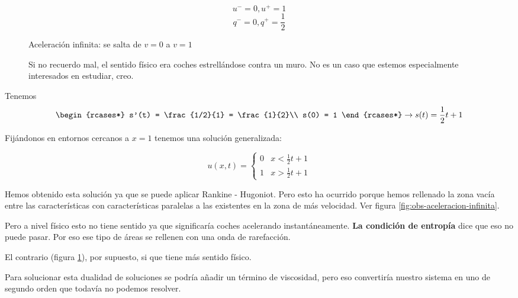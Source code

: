 		$$u^{-} = 0, u^+ = 1$$
		$$q^{-} = 0, q^+ = \frac{1}{2}$$

		\begin{figure}[hbtp]
			\centering
			\begin{minipage}[t]{0.45\textwidth}
				\centering
				\caption{Aceleración infinita: se salta de $v=0$ a $v=1$}
				\label{fig:obs-aceleracion-infinita}
			\end{minipage}\quad
			\begin{minipage}[t]{0.45\textwidth}
				\centering
				\caption{Si no recuerdo mal, el sentido físico era coches estrellándose contra un muro. No es un caso que estemos especialmente interesados en estudiar, creo.}
				\label{fig:obs-muro}
			\end{minipage}
		\end{figure}

		Tenemos
		\[
		\begin{rcases*}
			s'(t) = \frac{1/2}{1} = \frac{1}{2}\\
			s(0) = 1
		\end{rcases*} \rightarrow s(t) = \frac{1}{2}t + 1
		\]

		Fijándonos en entornos cercanos a $x=1$ tenemos una solución generalizada:

		$$u(x,t) =
		\begin{cases}
			0 & x < \frac{1}{2} t + 1 \\
			1 & x > \frac{1}{2} t + 1
		\end{cases}$$


		Hemos obtenido esta solución ya que se puede aplicar Rankine - Hugoniot. Pero esto ha ocurrido porque hemos rellenado la zona vacía entre las características con características paralelas a las existentes en la zona de más velocidad. Ver figura \ref{fig:obs-aceleracion-infinita}.

		Pero a nivel físico esto no tiene sentido ya que significaría coches acelerando instantáneamente. {\bf La condición de entropía} dice que eso no puede pasar. Por eso ese tipo de áreas se rellenen con una onda de rarefacción.

		El contrario (figura \ref{fig:obs-muro}), por supuesto, si que tiene más sentido físico.

		Para solucionar esta dualidad de soluciones se podría añadir un término de viscosidad, pero eso convertiría nuestro sistema en uno de segundo orden que todavía no podemos resolver.

